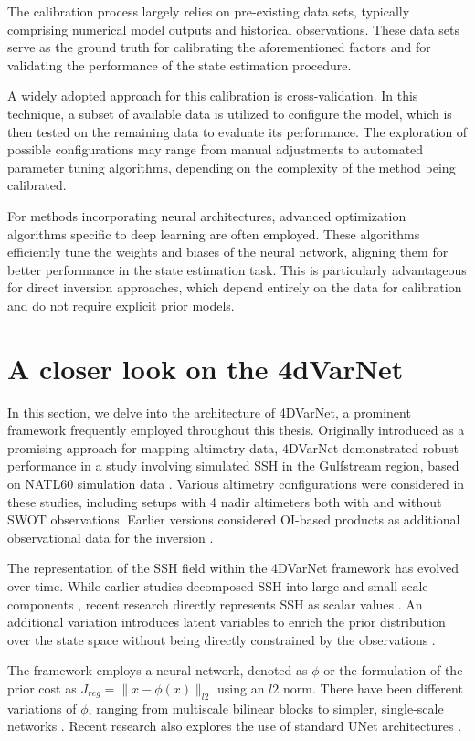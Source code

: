 \begin{bibunit}
The calibration process largely relies on pre-existing data sets, typically comprising numerical model outputs and historical observations. These data sets serve as the ground truth for calibrating the aforementioned factors and for validating the performance of the state estimation procedure.

A widely adopted approach for this calibration is cross-validation. In this technique, a subset of available data is utilized to configure the model, which is then tested on the remaining data to evaluate its performance. The exploration of possible configurations may range from manual adjustments to automated parameter tuning algorithms, depending on the complexity of the method being calibrated.

For methods incorporating neural architectures, advanced optimization algorithms specific to deep learning are often employed. These algorithms efficiently tune the weights and biases of the neural network, aligning them for better performance in the state estimation task. This is particularly advantageous for direct inversion approaches, which depend entirely on the data for calibration and do not require explicit prior models.


\section{A closer look on the 4dVarNet}
In this section, we delve into the architecture of 4DVarNet, a prominent framework frequently employed throughout this thesis. 
Originally introduced as a promising approach for mapping altimetry data, 4DVarNet demonstrated robust performance in a study involving simulated SSH in the Gulfstream region, based on NATL60 simulation data \cite{}. Various altimetry configurations were considered in these studies, including setups with 4 nadir altimeters both with and without SWOT observations. Earlier versions considered OI-based products as additional observational data for the inversion \cite{}.

The representation of the SSH field within the 4DVarNet framework has evolved over time. While earlier studies decomposed SSH into large and small-scale components \cite{}, recent research directly represents SSH as scalar values \cite{}. An additional variation introduces latent variables to enrich the prior distribution over the state space without being directly constrained by the observations \cite{}.

The framework employs a neural network, denoted as  $\phi$  or the formulation of the prior cost as $J_{reg}= \|x - \phi(x)\|_{l2}$ using an $l2$ norm.
There have been different variations of $\phi$, ranging from multiscale bilinear blocks \cite{} to simpler, single-scale networks \cite{}. Recent research also explores the use of standard UNet architectures \cite{}.


\end{bibunit}

